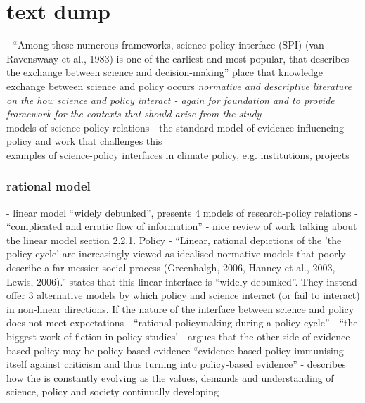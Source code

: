 \section{text dump}

\cite{JagannathanEtAl2023} - ``Among these numerous frameworks, science-policy interface (SPI) (van Ravenswaay et al., 1983) is one of the earliest and most popular, that describes the exchange between science and decision-making''
place that knowledge exchange between science and policy occurs
\emph{normative and descriptive literature on the how science and policy interact - again for foundation and to provide framework for the contexts that should arise from the study}\\
models of science-policy relations - the standard model of evidence influencing policy and work that challenges this\\
examples of science-policy interfaces in climate policy, e.g. institutions, projects

\subsubsection{rational model}
\cite{BoswellS2017} - linear model ``widely debunked'', presents 4 models of research-policy relations
\cite{BednarekSHG2015} - ``complicated and erratic flow of information''
\cite{McNie2007} - nice review of work talking about the linear model section 2.2.1. Policy
\cite{HaynesDCRHGS2011} - ``Linear, rational depictions of the 'the policy cycle' are increasingly viewed as idealised normative models that poorly describe a far messier social process (Greenhalgh, 2006, Hanney et al., 2003, Lewis, 2006).''
\textcite{BoswellS2017} states that this linear  interface is ``widely debunked''. They instead offer 3 alternative models by which policy and science interact (or fail to interact) in non-linear directions. If the nature of the interface between science and policy does not meet expectations 
\cite{Cairney2018} - ``rational policymaking during a policy cycle'' - ``the biggest work of fiction in policy studies'
\cite{StrassheimK2014} - argues that the other side of evidence-based policy may be policy-based evidence ``evidence-based policy immunising itself against criticism and thus turning into policy-based evidence''
\cite{Obermeister2020} - describes how the \SPI{} is constantly evolving as the values, demands and understanding of science, policy and society continually developing

